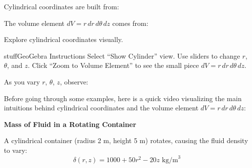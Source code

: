 \documentclass{ximera}
\begin{document}
\begin{problem}
Cylindrical coordinates are built from:
\begin{selectAll}
\end{selectAll}

The volume element $dV = r\,dr\,d\theta\,dz$ comes from:
\begin{multipleChoice}
\end{multipleChoice}
\end{problem}

\begin{problem}
Explore cylindrical coordinates visually.

\begin{expandable}{stuff}{GeoGebra Instructions}
    Select ``Show Cylinder'' view. Use sliders to change $r$, $\theta$, and $z$. Click ``Zoom to Volume Element'' to see the small piece $dV = r\,dr\,d\theta\,dz$.
\end{expandable}

\begin{center}
\end{center}

As you vary $r$, $\theta$, $z$, observe:
\begin{selectAll}
\end{selectAll}


\end{problem}

Before going through some examples, here is a quick video visualizing the main intuitions behind cylindrical coordinates and the volume element $dV = r\,dr\,d\theta\,dz$:





\textbf{Mass of Fluid in a Rotating Container}

A cylindrical container (radius 2 m, height 5 m) rotates, causing the fluid density to vary:
$$\delta(r,z) = 1000 + 50r^2 - 20z \text{ kg/m}^3$$
\end{document}

